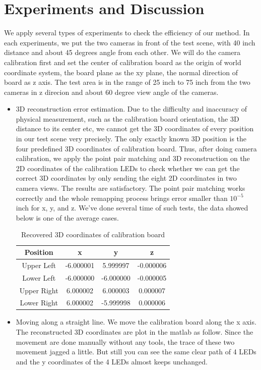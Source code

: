 \documentclass[10pt,twocolumn,letterpaper]{article}
\begin{document}
\section{Experiments and Discussion}
We apply several types of experiments to check the efficiency of our method. In each experiments, we put the two cameras in front of the test scene, with 40 inch distance and about 45 degrees angle from each other. We will do the camera calibration first and set the center of calibration board as the origin of world coordinate system, the board plane as the xy plane, the normal direction of board as z axis. The test area is in the range of 25 inch to 75 inch from the two cameras in z direcion and about 60 degree view angle of the cameras.
\begin{itemize}
\item 3D reconstruction error estimation. Due to the difficulty and inaccuracy of physical measurement, such as the calibration board orientation, the 3D distance to its center etc, we cannot get the 3D coordinates of every position in our test scene very precisely. The only exactly known 3D position is the four predefined 3D coordinates of calibration board. Thus, after doing camera calibration, we apply the point pair matching and 3D reconstruction on the 2D coordinates of the calibration LEDs to check whether we can get the correct 3D coordinates by only sending the eight 2D coordinates in two camera views. The results are satisfactory. The point pair matching works correctly and the whole remapping process brings error smaller than $10^{-5}$ inch for x, y, and z. We've done several time of such tests, the data showed below is one of the average cases.
\begin{table}[ht]
\caption{Recovered 3D coordinates of calibration board}
\centering
\begin{tabular}{c c c c}
\hline\hline
Position & x & y & z\\[0.5ex]
\hline
Upper Left & -6.000001	& 5.999997	& -0.000006 \\
Lower Left &-6.000000	& -6.000000	& -0.000005\\
Upper Right & 6.000002	& 6.000003	& 0.000007\\
Lower Right & 6.000002	& -5.999998	& 0.000006 \\[1ex]
\hline
\end{tabular}
\end{table}
\item Moving along a straight line. We move the calibration board along the x axis. The reconstructed 3D coordinates are plot in the matlab as follow. Since the movement are done manually without any tools, the trace of these two movement jagged a little. But still you can see the same clear path of 4 LEDs and the y coordinates of the 4 LEDs almost keeps unchanged. 

\end{itemize}
\end{document}
